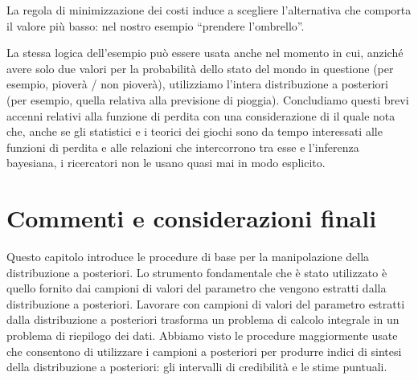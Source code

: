 \documentclass[
  11pt,
]{krantz}
\theoremstyle{definition}
\theoremstyle{definition}
\theoremstyle{definition}
\theoremstyle{definition}
\theoremstyle{remark}
\begin{document}
La regola di minimizzazione dei costi induce a scegliere l'alternativa che comporta il valore più basso: nel nostro esempio ``prendere l'ombrello''.

La stessa logica dell'esempio può essere usata anche nel momento in cui, anziché avere solo due valori per la probabilità dello stato del mondo in questione (per esempio, pioverà / non pioverà), utilizziamo l'intera distribuzione a posteriori (per esempio, quella relativa alla previsione di pioggia). Concludiamo questi brevi accenni relativi alla funzione di perdita con una considerazione di \citet{McElreath_rethinking} il quale nota che, anche se gli statistici e i teorici dei giochi sono da tempo interessati alle funzioni di perdita e alle relazioni che intercorrono tra esse e l'inferenza bayesiana, i ricercatori non le usano quasi mai in modo esplicito.

\hypertarget{commenti-e-considerazioni-finali-1}{%
\section*{Commenti e considerazioni finali}\label{commenti-e-considerazioni-finali-1}}


Questo capitolo introduce le procedure di base per la manipolazione della distribuzione a posteriori. Lo strumento fondamentale che è stato utilizzato è quello fornito dai campioni di valori del parametro che vengono estratti dalla distribuzione a posteriori. Lavorare con campioni di valori del parametro estratti dalla distribuzione a posteriori trasforma un problema di calcolo integrale in un problema di riepilogo dei dati. Abbiamo visto le procedure maggiormente usate che consentono di utilizzare i campioni a posteriori per produrre indici di sintesi della distribuzione a posteriori: gli intervalli di credibilità e le stime puntuali.

  

\printindex
\end{document}
